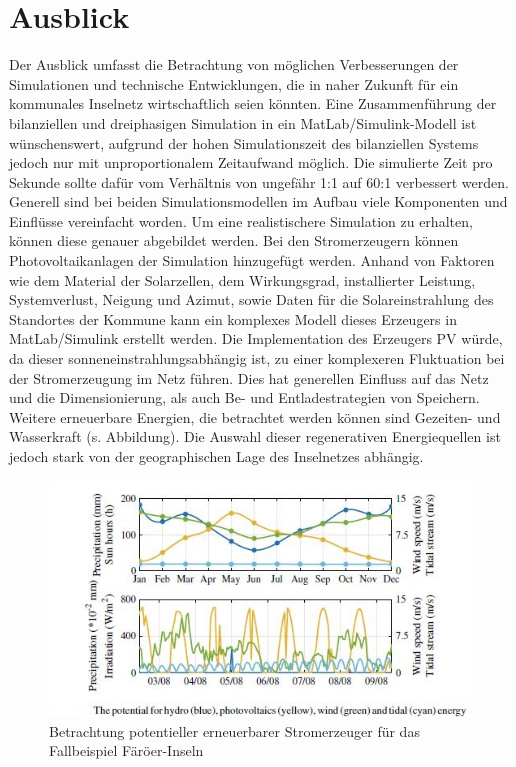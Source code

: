 \chapter{Ausblick}

Der Ausblick umfasst die Betrachtung von möglichen Verbesserungen der Simulationen und technische Entwicklungen, die in naher Zukunft für ein kommunales Inselnetz wirtschaftlich seien könnten.
Eine Zusammenführung der bilanziellen und dreiphasigen Simulation in ein MatLab/Simulink-Modell ist wünschenswert, aufgrund der hohen Simulationszeit des bilanziellen Systems jedoch nur mit unproportionalem Zeitaufwand möglich.
Die simulierte Zeit pro Sekunde sollte dafür vom Verhältnis von ungefähr 1:1 auf 60:1 verbessert werden.
Generell sind bei beiden Simulationsmodellen im Aufbau viele Komponenten und Einflüsse vereinfacht worden. 
Um eine realistischere Simulation zu erhalten, können diese genauer abgebildet werden.
Bei den Stromerzeugern können Photovoltaikanlagen der Simulation hinzugefügt werden.
Anhand von Faktoren wie dem Material der Solarzellen, dem Wirkungsgrad, installierter Leistung, Systemverlust, Neigung und Azimut, sowie Daten für die Solareinstrahlung des Standortes der Kommune kann ein komplexes Modell dieses Erzeugers in MatLab/Simulink erstellt werden\cite{jrcpv}.
Die Implementation des Erzeugers PV würde, da dieser sonneneinstrahlungsabhängig ist, zu einer komplexeren Fluktuation bei der Stromerzeugung im Netz führen. 
Dies hat generellen Einfluss auf das Netz und die Dimensionierung, als auch Be- und Entladestrategien von Speichern.
Weitere erneuerbare Energien, die betrachtet werden können sind Gezeiten- und Wasserkraft (s. Abbildung).
Die Auswahl dieser regenerativen Energiequellen ist jedoch stark von der geographischen Lage des Inselnetzes abhängig.
  
\begin{figure}[h!]
    \centering
    \includegraphics[width=14cm]{Abbildungen/AusblickAbb1.jpg}
    \caption{Betrachtung potentieller erneuerbarer Stromerzeuger für das Fallbeispiel Färöer-Inseln\cite{faroer}}\label{fig:Stromerzeuger_Faroer}
\end{figure}

